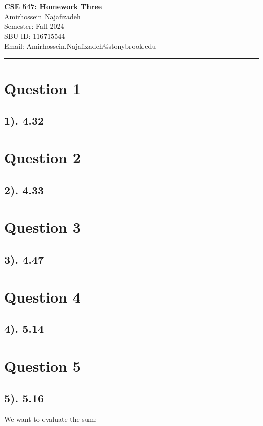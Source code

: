 \documentclass[12pt]{article}
\begin{document}
\begin{center}
    {\LARGE\textbf{CSE 547: Homework Three}} \\[1em]
    {\large Amirhossein Najafizadeh} \\[1em]
    Semester: Fall 2024 \\ 
    SBU ID: 116715544 \\
    Email: Amirhossein.Najafizadeh@stonybrook.edu \\[1em]
    \noindent\rule{\textwidth}{0.6pt}
\end{center}

\section*{Question 1}
\subsection*{1). 4.32}

\section*{Question 2}
\subsection*{2). 4.33}

\section*{Question 3}
\subsection*{3). 4.47}

\section*{Question 4}
\subsection*{4). 5.14}

\section*{Question 5}
\subsection*{5). 5.16}
We want to evaluate the sum:
\end{document}
